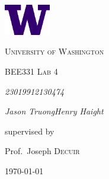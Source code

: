 \documentclass[9pt,a4paper]{report}
\begin{document}
	\begin{titlepage}
		\centering
		\vspace*{1.5in}
		\includegraphics[width=0.15\textwidth]{W-Logo_Purple_RGB}\par\vspace{1cm}
		{\LARGE \textsc{University of Washington}\par}
		\vspace{1cm}
		{\Large \textsc{BEE331 Lab 4}\par}
		\vspace{1.5cm}
		{\huge\bfseries \par}
		\vspace{2cm}
		{\Large\itshape 2301991\hspace{55pt}2130474\par}
		{\Large\itshape Jason Truong\hspace{31pt}Henry Haight\par}
		\vfill
		supervised by\par
		Prof.~Joseph \textsc{Decuir}
		\date{2024\\ January}
		\vfill
		{\large \today\par}
		\vspace*{1.5in}
	\end{titlepage}
	
\end{document}
